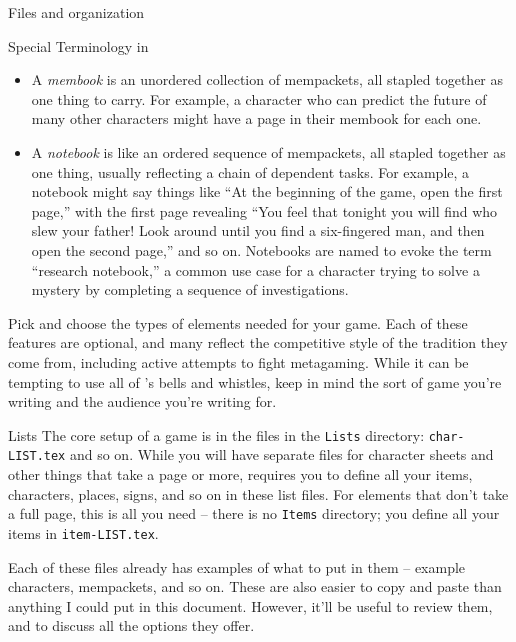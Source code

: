 \documentclass[sheet]{GameTexBase}
\begin{document}
\begin{section}{Files and organization}
\begin{subsection}{Special Terminology in \gametex{}}
\begin{itemize}
    \item A \textit{membook} is an unordered collection of mempackets, all stapled together as one thing to carry.  For example, a character who can predict the future of many other characters might have a page in their membook for each one.
    \item A \textit{notebook} is like an ordered sequence of mempackets, all stapled together as one thing, usually reflecting a chain of dependent tasks.  For example, a notebook might say things like ``At the beginning of the game, open the first page,'' with the first page revealing ``You feel that tonight you will find who slew your father!  Look around until you find a six-fingered man, and then open the second page,'' and so on.  Notebooks are named to evoke the term ``research notebook,'' a common use case for a character trying to solve a mystery by completing a sequence of investigations.
\end{itemize}

Pick and choose the types of elements needed for your game.  Each of these features are optional, and many reflect the competitive style of the tradition they come from, including active attempts to fight metagaming.  While it can be tempting to use all of \gametex{}'s bells and whistles, keep in mind the sort of game you're writing and the audience you're writing for.

\begin{subsubsection}{Lists}
\label{lists}
The core setup of a game is in the files in the \lstinline{Lists} directory: \lstinline{char-LIST.tex} and so on.
While you will have separate files for character sheets and other things that take a page or more, \gametex{} requires you to define all your items, characters, places, signs, and so on in these list files.
For elements that don't take a full page, this is all you need -- there is no \texttt{Items} directory; you define all your items in \lstinline{item-LIST.tex}.


Each of these files already has examples of what to put in them -- example characters, mempackets, and so on.  These are also easier to copy and paste than anything I could put in this document.
However, it'll be useful to review them, and to discuss all the options they offer.


\end{subsubsection}
\end{subsection}
\end{section}
\end{document}
